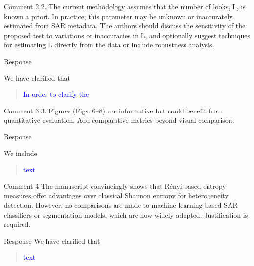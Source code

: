 \documentclass[11pt]{report}
\begin{document}
\begin{reviewbox}{Comment 2}
2. The current methodology assumes that the number of looks, L, is known a priori. In practice, this parameter may be unknown or inaccurately estimated from SAR metadata. The authors should discuss the sensitivity of the proposed test to variations or inaccuracies in L, and optionally suggest techniques for estimating L directly from the data or include robustness analysis. 
\end{reviewbox}

\begin{responsebox}{Response}


We have clarified that
\begin{quote}
	\textcolor{blue}{
		In order to clarify the }

\end{quote}

\end{responsebox}

\begin{reviewbox}{Comment 3}
3. Figures (Figs. 6–8) are informative but could benefit from quantitative evaluation. Add comparative metrics beyond visual comparison.
\end{reviewbox}

\begin{responsebox}{Response}


We include 


\begin{quote}
	\textcolor{blue}{
	text
}
\end{quote}
	
\end{responsebox}


\begin{reviewbox}{Comment 4}
The manuscript convincingly shows that Rényi-based entropy measures offer advantages over classical Shannon entropy for heterogeneity detection. However, no comparisons are made to machine learning-based SAR classifiers or segmentation models, which are now widely adopted. Justification is required.
\end{reviewbox}
\begin{responsebox}{Response}
We have clarified that
\begin{quote}
	\textcolor{blue}{
		text
}
\end{quote}

\end{responsebox}
\end{document}
